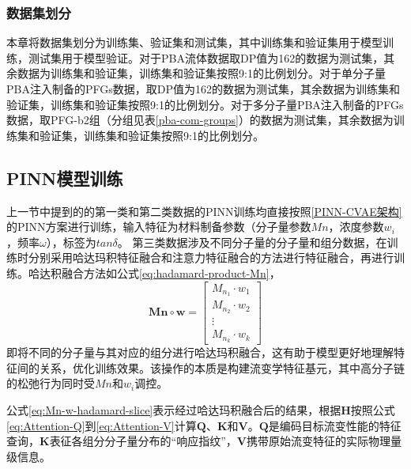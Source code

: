 \subsubsection{数据集划分}
本章将数据集划分为训练集、验证集和测试集，其中训练集和验证集用于模型训练，测试集用于模型验证。对于PBA流体数据取DP值为162的数据为测试集，其余数据为训练集和验证集，训练集和验证集按照9:1的比例划分。对于单分子量PBA注入制备的PFGs数据，取DP值为162的数据为测试集，其余数据为训练集和验证集，训练集和验证集按照9:1的比例划分。对于多分子量PBA注入制备的PFGs数据，取PFG-b2组（分组见表\ref{pba-com-groups}）的数据为测试集，其余数据为训练集和验证集，训练集和验证集按照9:1的比例划分。

\subsection{PINN模型训练}
上一节中提到的的第一类和第二类数据的PINN训练均直接按照\ref{PINN-CVAE架构}的PINN方案进行训练，输入特征为材料制备参数（分子量参数$Mn$，浓度参数$w_i$，频率$\omega$），标签为$tan\delta$。
第三类数据涉及不同分子量的分子量和组分数据，在训练时分别采用哈达玛积特征融合和注意力特征融合的方法进行特征融合，再进行训练。哈达积融合方法如公式\eqref{eq:hadamard-product-Mn}，
\begin{equation}
  \mathbf{Mn} \circ \mathbf{w} =
  \begin{bmatrix}
    M_{n_1} \cdot w_1 \\
    M_{n_2} \cdot w_2 \\
    \vdots            \\
    M_{n_k} \cdot w_k
  \end{bmatrix} \label{eq:hadamard-product-Mn}
\end{equation}
即将不同的分子量与其对应的组分进行哈达玛积融合，这有助于模型更好地理解特征间的关系，优化训练效果。该操作的本质是构建流变学特征基元，其中高分子链的松弛行为同时受$Mn$和$w_i$调控。

公式\eqref{eq:Mn-w-hadamard-slice}表示经过哈达玛积融合后的结果，根据$\mathbf{H}$按照公式\eqref{eq:Attention-Q}到\eqref{eq:Attention-V}计算$\mathbf{Q}$、$\mathbf{K}$和$\mathbf{V}$。$\mathbf{Q}$是编码目标流变性能的特征查询，$\mathbf{K}$表征各组分分子量分布的“响应指纹”，$\mathbf{V}$携带原始流变特征的实际物理量级信息。

